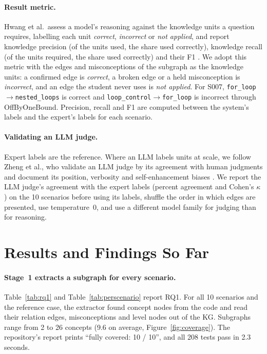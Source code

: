\documentclass[sigconf,nonacm]{acmart}
\newcommand{\code}[1]{\texttt{#1}}
\begin{document}
\paragraph{Result metric.} Hwang et al.\ assess a model's reasoning against the knowledge units a question requires,
labelling each unit \emph{correct}, \emph{incorrect} or \emph{not applied}, and report knowledge precision (of the units
used, the share used correctly), knowledge recall (of the units required, the share used correctly) and their F1
\cite{hwang2025principal}. We adopt this metric with the edges and misconceptions of the subgraph as the knowledge units:
a confirmed edge is \emph{correct}, a broken edge or a held misconception is \emph{incorrect}, and an edge the student
never uses is \emph{not applied}. For S007, \code{for\_loop}$\to$\code{nested\_loops} is correct and
\code{loop\_control}$\to$\code{for\_loop} is incorrect through OffByOneBound. Precision, recall and F1 are computed
between the system's labels and the expert's labels for each scenario.

\paragraph{Validating an LLM judge.} Expert labels are the reference. Where an LLM labels units at scale, we follow
Zheng et al., who validate an LLM judge by its agreement with human judgments and document its position, verbosity and
self-enhancement biases \cite{zheng2023judging}. We report the LLM judge's agreement with the expert labels (percent
agreement and Cohen's $\kappa$) on the 10 scenarios before using its labels, shuffle the order in which edges are
presented, use temperature~0, and use a different model family for judging than for reasoning.

\section{Results and Findings So Far}
\label{sec:results}
\paragraph{Stage~1 extracts a subgraph for every scenario.} Table~\ref{tab:rq1} and Table~\ref{tab:perscenario} report
RQ1. For all 10 scenarios and the reference case, the extractor found concept nodes from the code and read their
relation edges, misconceptions and level nodes out of the KG. Subgraphs range from 2 to 26 concepts (9.6 on average,
Figure~\ref{fig:coverage}). The repository's report prints ``fully covered: 10 / 10'', and all 208 tests pass in 2.3
seconds.
\end{document}
